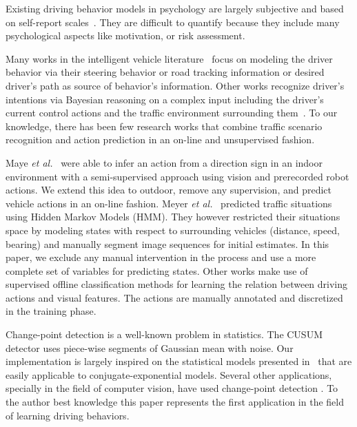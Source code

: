 Existing driving behavior models in psychology are largely subjective and based
on self-report scales~\cite{ranney94models}. They are difficult to quantify
because they include many psychological aspects like motivation, or risk
assessment.

Many works in the intelligent vehicle
literature~\cite{donges78two,mcruer80human,hess90control,macadam81application}
focus on modeling the driver behavior via their steering behavior or road
tracking information or desired driver's path as source of behavior's
information. Other works recognize driver's intentions via Bayesian reasoning on
a complex input including the driver's current control actions and the traffic
environment surrounding them~\cite{oliver00graphical,liu01modeling}. To our
knowledge, there has been few research works that combine traffic scenario
recognition and action prediction in an on-line and unsupervised fashion.

Maye \emph{et al.}~\cite{maye10inferring} were able to infer an action from a
direction sign in an indoor environment with a semi-supervised approach
using vision and prerecorded robot actions. We extend this idea to outdoor,
remove any supervision, and predict vehicle actions in an on-line fashion.
Meyer \emph{et al.}~\cite{meyer09probabilistic} predicted traffic situations
using Hidden Markov Models (HMM). They however restricted their situations space
by modeling states with respect to surrounding vehicles (distance, speed,
bearing) and manually segment image sequences for initial estimates. In this
paper, we exclude any manual intervention in the process and use a more complete
set of variables for predicting states.
Other works  \cite{heracles10vision,pugeault10learning} make use of supervised 
offline classification methods for learning the relation between driving actions and 
visual features. The actions are manually annotated and discretized in the training phase.

Change-point detection is a well-known problem in statistics. The CUSUM detector
\cite{page54continuous} uses piece-wise segments of Gaussian mean with noise.
Our implementation is largely inspired on the statistical models presented
in~\cite{adams07bayesian,fearnhead07online} that are easily applicable to
conjugate-exponential models. Several other applications, specially in the field
of computer vision, have used change-point detection
\cite{zhai05general,cemgil05hybrid}. To the author best knowledge this paper
represents the first application in the field of learning driving behaviors.
